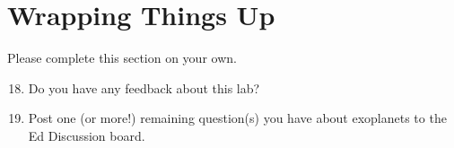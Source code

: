 \documentclass[11pt]{article}
\begin{document}
\section{Wrapping Things Up}
\noindent Please complete this section on your own.
\begin{enumerate}
\setcounter{enumi}{17}
    \item Do you have any feedback about this lab?
    
    \item Post one (or more!) remaining question(s) you have about exoplanets to the Ed Discussion board.

\end{enumerate}
\end{document}

